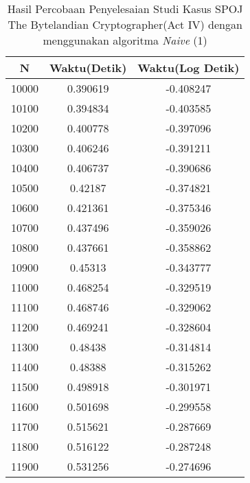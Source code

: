\begin{table}[H]
\centering
\caption {Hasil Percobaan Penyelesaian Studi Kasus SPOJ The Bytelandian Cryptographer(Act IV) dengan menggunakan algoritma \textit{Naive} (1)}
\begin{tabular}{|c|c|c|}\hline
N&Waktu(Detik)&Waktu(Log Detik)\\ \hline
10000&0.390619&-0.408247\\ \hline
10100&0.394834&-0.403585\\ \hline
10200&0.400778&-0.397096\\ \hline
10300&0.406246&-0.391211\\ \hline
10400&0.406737&-0.390686\\ \hline
10500&0.42187&-0.374821\\ \hline
10600&0.421361&-0.375346\\ \hline
10700&0.437496&-0.359026\\ \hline
10800&0.437661&-0.358862\\ \hline
10900&0.45313&-0.343777\\ \hline
11000&0.468254&-0.329519\\ \hline
11100&0.468746&-0.329062\\ \hline
11200&0.469241&-0.328604\\ \hline
11300&0.48438&-0.314814\\ \hline
11400&0.48388&-0.315262\\ \hline
11500&0.498918&-0.301971\\ \hline
11600&0.501698&-0.299558\\ \hline
11700&0.515621&-0.287669\\ \hline
11800&0.516122&-0.287248\\ \hline
11900&0.531256&-0.274696\\ \hline
\end{tabular}
\label{tab:res2}
\end{table}
